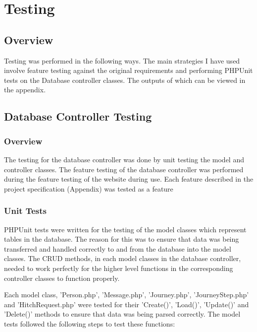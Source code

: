 \chapter{Testing}

\section{Overview}

Testing was performed in the following ways. The main strategies I have used involve feature testing against the original requirements and performing PHPUnit tests on the Database controller classes. The outputs of which can be viewed in the appendix.

\section{Database Controller Testing}
	\subsection{Overview}
		The testing for the database controller was done by unit testing the model and controller classes. The feature testing of the database controller was performed during the feature testing of the website during use. Each feature described in the project specification (Appendix) was tested as a feature

	\subsection{Unit Tests}
		PHPUnit tests were written for the testing of the model classes which represent tables in the database. The reason for this was to ensure that data was being transferred and handled correctly to and from the database into the model classes. The CRUD methods, in each model classes in the database controller, needed to work perfectly for the higher level functions in the corresponding controller classes to function properly. 

		Each model class, 'Person.php', 'Message.php', 'Journey.php', 'Journey\textunderscore Step.php' and 'Hitch\textunderscore Request.php' were tested for their 'Create()', 'Load()', 'Update()' and 'Delete()' methods to ensure that data was being parsed correctly. The model tests followed the following steps to test these functions:


